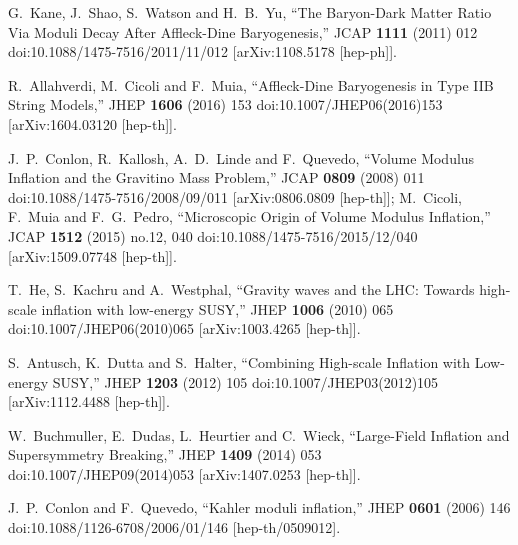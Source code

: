 \documentclass[11pt,a4paper]{article}
\begin{document}
\begin{thebibliography}{99}
  G.~Kane, J.~Shao, S.~Watson and H.~B.~Yu,
  ``The Baryon-Dark Matter Ratio Via Moduli Decay After Affleck-Dine Baryogenesis,''
  JCAP {\bf 1111} (2011) 012
  doi:10.1088/1475-7516/2011/11/012
  [arXiv:1108.5178 [hep-ph]].
	
  R.~Allahverdi, M.~Cicoli and F.~Muia,
  ``Affleck-Dine Baryogenesis in Type IIB String Models,''
  JHEP {\bf 1606} (2016) 153
  doi:10.1007/JHEP06(2016)153
  [arXiv:1604.03120 [hep-th]].

  J.~P.~Conlon, R.~Kallosh, A.~D.~Linde and F.~Quevedo,
  ``Volume Modulus Inflation and the Gravitino Mass Problem,''
  JCAP {\bf 0809} (2008) 011
  doi:10.1088/1475-7516/2008/09/011
  [arXiv:0806.0809 [hep-th]];
M.~Cicoli, F.~Muia and F.~G.~Pedro,
  ``Microscopic Origin of Volume Modulus Inflation,''
  JCAP {\bf 1512} (2015) no.12,  040
  doi:10.1088/1475-7516/2015/12/040
  [arXiv:1509.07748 [hep-th]].

  T.~He, S.~Kachru and A.~Westphal,
  ``Gravity waves and the LHC: Towards high-scale inflation with low-energy SUSY,''
  JHEP {\bf 1006} (2010) 065
  doi:10.1007/JHEP06(2010)065
  [arXiv:1003.4265 [hep-th]].

  S.~Antusch, K.~Dutta and S.~Halter,
  ``Combining High-scale Inflation with Low-energy SUSY,''
  JHEP {\bf 1203} (2012) 105
  doi:10.1007/JHEP03(2012)105
  [arXiv:1112.4488 [hep-th]].

  W.~Buchmuller, E.~Dudas, L.~Heurtier and C.~Wieck,
  ``Large-Field Inflation and Supersymmetry Breaking,''
  JHEP {\bf 1409} (2014) 053
  doi:10.1007/JHEP09(2014)053
  [arXiv:1407.0253 [hep-th]].

  J.~P.~Conlon and F.~Quevedo,
  ``Kahler moduli inflation,''
  JHEP {\bf 0601} (2006) 146
  doi:10.1088/1126-6708/2006/01/146
  [hep-th/0509012].


\end{thebibliography}
\end{document}
